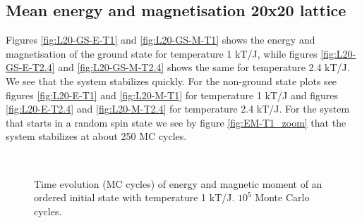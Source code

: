 \documentclass{emulateapj}
\begin{document}
\subsection{Mean energy and magnetisation 20x20 lattice}
Figures \ref{fig:L20-GS-E-T1} and \ref{fig:L20-GS-M-T1} shows the energy and magnetisation of the ground state for temperature 1 kT/J, while figures \ref{fig:L20-GS-E-T2.4} and \ref{fig:L20-GS-M-T2.4} shows the same for temperature 2.4 kT/J. We see that the system stabilizes quickly. For the non-ground state plots see figures \ref{fig:L20-E-T1} and \ref{fig:L20-M-T1} for temperature 1 kT/J and figures \ref{fig:L20-E-T2.4} and \ref{fig:L20-M-T2.4} for temperature 2.4 kT/J. For the system that starts in a random spin state we see by figure \ref{fig:EM-T1_zoom} that the system stabilizes at about 250 MC cycles.
%
\begin{figure}
 \\
\caption{Time evolution (MC cycles) of energy and magnetic moment of an ordered initial state with temperature 1 kT/J. $10^5$ Monte Carlo cycles.}
\label{fig:EM-GS-T1}
\end{figure}
\end{document}
